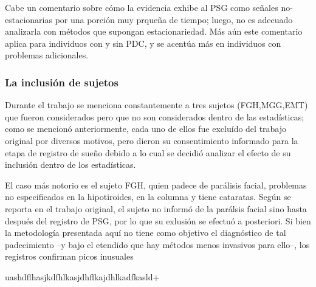 Cabe un comentario sobre c\'omo la evidencia exhibe al PSG como se\~nales no-estacionarias
por una porci\'on muy prque\~na de tiempo; luego, no es adecuado analizarla con m\'etodos que
supongan estacionariedad. M\'as a\'un este comentario aplica para individuos con y sin PDC, y
se acent\'ua m\'as en individuos con problemas adicionales.

\subsubsection{La inclusi\'on de sujetos}


Durante el trabajo se menciona constantemente a tres sujetos (FGH,MGG,EMT) que fueron considerados
pero que no son considerados dentro de las estad\'isticas; 
como se mencion\'o anteriormente,
cada uno de ellos fue exclu\'ido del
trabajo original por diversos motivos, pero dieron su consentimiento informado para la etapa
de registro de sue\~no debido a lo cual se decidi\'o analizar el efecto de su inclusi\'on dentro 
de los estad\'isticas.

El caso m\'as notorio es el sujeto FGH, quien padece de par\'alisis facial, problemas 
no especificados en la 
hipotiroides, en la columna y tiene cataratas. Seg\'un se reporta en el trabajo original,
el sujeto no inform\'o de la par\'alsis facial sino hasta despu\'es del registro de PSG, por lo
que su exlusi\'on se efectu\'o a posteriori.
Si bien la metodolog\'ia presentada aqu\'i no tiene como objetivo el diagn\'ostico
de tal padecimiento --y bajo el etendido que hay m\'etodos menos invasivos para ello--, los
registros confirman picos inusuales 


uashdflhasjkdfhlkasjdhflkajdhlkadfkasld+


